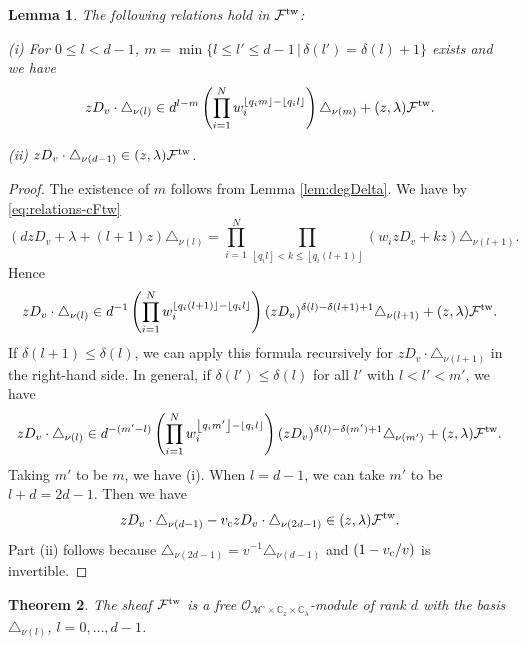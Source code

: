 \documentclass[11pt]{amsart}
\newtheorem{thm}{Theorem}[section] %
\newtheorem{lem}[thm]{Lemma} %
\theoremstyle{definition} %
\theoremstyle{remark} %
\newcommand{\CC}{\mathbb C}
\newcommand{\tw}{{\rm tw}}
\def\floor#1{\left\lfloor #1 \right\rfloor}
\newcommand{\cO}{\mathcal{O}}
\newcommand{\cMo}{\mathcal{M}^\circ}
\newcommand{\cF}{\mathcal{F}}
\newcommand{\vc}{v_{\rm c}}
\begin{document}
\begin{lem} 
\label{lem:mult-by-zDv} 
The following relations hold in $\cF^\tw$: 

{\rm (i)} For $0\le l <d-1$, 
$m = \min\{ l\le l'\le d-1 \,|\, \delta(l') = \delta(l)+1\}$ exists and we have 
\[
zD_v \cdot \triangle_{\nu(l)} \in d^{l-m} 
\left(\prod_{i=1}^N w_i^{\floor{q_i m}-\floor{q_i l}} \right) 
\triangle_{\nu(m)} + (z,\lambda) \cF^\tw. 
\]

{\rm (ii)}  $zD_v\cdot \triangle_{\nu(d-1)} \in (z,\lambda) \cF^\tw$. 
\end{lem} 
\begin{proof} 
The existence of $m$ follows from Lemma \ref{lem:degDelta}. 
We have by \eqref{eq:relations-cFtw}
\[
(d zD_v + \lambda+(l+1)z) \triangle_{\nu(l)} 
= \prod_{i=1}^N \prod_{\floor{q_il} < k \le \floor{q_i (l+1)}}
(w_i zD_v + kz) 
\triangle_{\nu(l+1)}.  
\]
Hence 
\[
zD_v \cdot \triangle_{\nu(l)} \in  d^{-1} \left(
\prod_{i=1}^N w_i^{\floor{q_i(l+1)}-\floor{q_il}}\right) 
(zD_v)^{\delta(l)-\delta(l+1)+1} \triangle_{\nu(l+1)} 
+ (z,\lambda) \cF^\tw.  
\]
If $\delta(l+1) \le \delta(l)$, we can apply 
this formula recursively for $zD_v \cdot \triangle_{\nu(l+1)}$ 
in the right-hand side. 
In general, if $\delta(l') \le \delta(l)$ for all 
$l'$ with $l<l'<m'$, we have 
\[
zD_v\cdot \triangle_{\nu(l)} \in d^{-(m'-l)} 
\left(\prod_{i=1}^N 
w_i^{\floor{q_im'} - \floor{q_i l}} \right) 
(zD_v)^{\delta(l) - \delta(m') +1} \triangle_{\nu(m')} 
+ (z,\lambda)\cF^\tw.  
\] 
Taking $m'$ to be $m$, we have (i). 
When $l= d-1$, we can take $m'$ to be $l + d = 2d-1$. 
Then we have 
\[
z D_v \cdot \triangle_{\nu(d-1)} - \vc  zD_v \cdot 
\triangle_{\nu(2d-1)} 
\in (z,\lambda)\cF^\tw. 
\]
Part (ii) follows because $\triangle_{\nu(2d -1)} = v^{-1} \triangle_{\nu(d-1)}$ 
and $(1- \vc/v)$ is invertible. 
\end{proof} 

\begin{thm} 
\label{thm:cFtw-free} 
The sheaf 
$\cF^\tw$ is a free 
$\cO_{\cMo\times \CC_z \times \CC_\lambda}$-module of rank $d$
with the basis $\triangle_{\nu(l)}$, $l=0,\dots,d-1$.  
\end{thm} 
\end{document}

